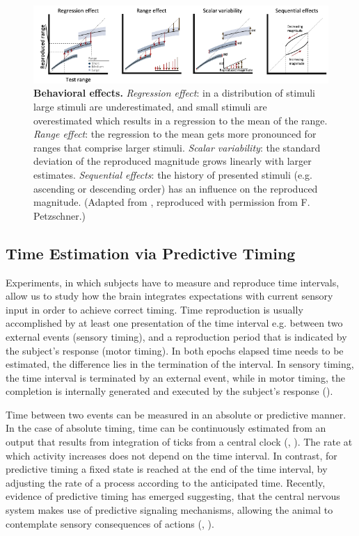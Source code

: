 \documentclass[10pt]{article}
\begin{document}
\begin{figure}[ht]
	\centering
	\includegraphics[width=\textwidth]{figures/behavioural_effects_petzschner.pdf}
	\caption{\textbf{Behavioral effects.} 
	\textit{Regression effect}: in a distribution of stimuli large stimuli are underestimated, and small stimuli are overestimated which results in a regression to the mean of the range.
	\textit{Range effect}: the regression to the mean gets more pronounced for ranges that comprise larger stimuli. 
	\textit{Scalar variability}: the standard deviation of the reproduced magnitude grows linearly with larger estimates. 
	\textit{Sequential effects}: the history of presented stimuli (e.g. ascending or descending order) has an influence on the reproduced magnitude. 
	(Adapted from \cite{Petzschner2015}, reproduced with permission from F. Petzschner.)}
	\label{fig:behavioraleffects}
\end{figure}

\subsection{Time Estimation via Predictive Timing}
Experiments, in which subjects have to measure and reproduce time intervals, allow us to study how the brain integrates expectations with current sensory input in order to achieve correct timing.
Time reproduction is usually accomplished by at least one presentation of the time interval e.g. between two external events (sensory timing), and a reproduction period that is indicated by the subject's response (motor timing).
In both epochs elapsed time needs to be estimated, the difference lies in the termination of the interval. In sensory timing, the time interval is terminated by an external event, while in motor timing, the completion is internally generated and executed by the subject's response (\cite{Grondin2010}).

Time between two events can be measured in an absolute or predictive manner. 
In the case of absolute timing, time can be continuously estimated from an output that results from integration of ticks from a central clock (\cite{Buhusi2005}, \cite{Paton2018}).
The rate at which activity increases does not depend on the time interval.
In contrast, for predictive timing a fixed state is reached at the end of the time interval, by adjusting the rate of a process according to the anticipated time.
Recently, evidence of predictive timing has emerged suggesting, that the central nervous system makes use of predictive signaling mechanisms, allowing the animal to contemplate sensory consequences of actions (\cite{Egger2019}, \cite{Meirhaeghe2021}).
\end{document}
